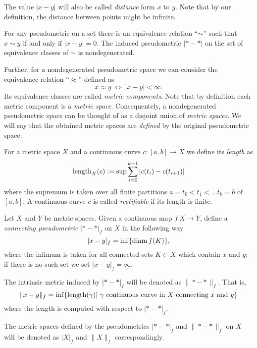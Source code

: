 \documentclass[a4paper,10pt]{amsart}
\begin{document}
The value $|x-y|$ will also be called \emph{distance} form $x$ to $y$.
Note that by our definition, the distance between points might be infinite.%

For any pseudometric on a set 
there is an equivalence relation ``$\sim$''
such that $x\sim y$ if and only if $|x-y|=0$.
The induced pseudometric $|{*}-{*}|$ on the set of equivalence classes of $\sim$ is nondegenerated.

Further, for a nondegenerated pseudometric space we can consider the equivalence relation ``$\approx$'' defined as \[x\approx y\  \iff\  |x-y|<\infty.\]
Its equivalence classes are called \emph{metric components}.
Note that by definition each metric component is a \emph{metric space}.
Consequentely, a nondegenerated pseudometric space 
can be thought of as a disjoint union of \emph{metric spaces}.
We will say that the obtained metric spaces are \emph{defined} by the  
original pseudometric space.%

For a metric space $X$ and a continuous curve $c:[a,b]\to X$ we define its {\em length} as
\[\mathop{\rm length}\nolimits_X(c):=\sup\sum_{i=0}^{k-1} |c(t_i)-c(t_{i+1})|\]
where the supremum is taken over all finite partitions ${a=t_0<t_1<\ldots t_k=b}$ of $[a,b]$. 
A continuous curve $c$ is called {\em rectifiable} if its length is finite.







Let $X$ and $Y$ be metric spaces.
Given a continuous map $f\:X\to Y$,
define a \emph{connecting pseudometric} $|{*}-{*}|_f$ on $X$ in
the following way
\[|x-y|_f=\inf\{\mathop{\rm diam}\nolimits f(K)\},\]
where the infimum is taken for all connected sets $K\subset X$ which contain $x$ and $y$;
if there is no such set we set $|x-y|_f=\infty$.

The intrinsic metric induced by $|{*}-{*}|_f$ will be denoted as 
$\|{*}-{*}\|_f$. 
That is, 
\[\|x-y\|_f=\inf\{\length(\gamma)|\ \gamma \text{ continuous curve in } X \text{ connecting } x \text{ and } y\}\]
where the length is computed with respect to $|{*}-{*}|_f$.

The metric spaces defined by the pseudometrics $|{*}-{*}|_f$ 
and $\|{*}-{*}\|_f$ on $X$ will be denoted as $|X|_f$ and $\|X\|_f$ correspondingly.
\end{document}
